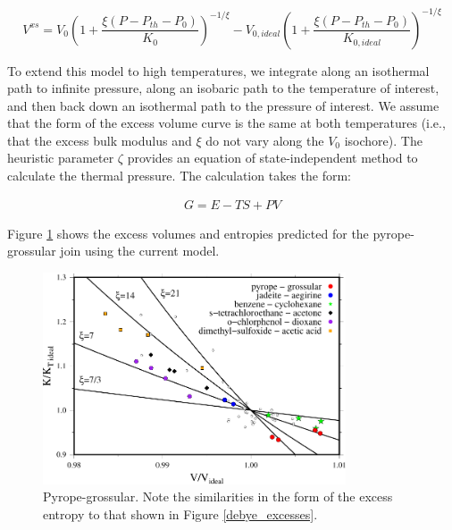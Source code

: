\begin{equation}
V^{xs} = V_0 \left(1 + \frac{\xi \left(P - P_{th} - P_0\right)}{K_0}\right)^{-1/\xi} - V_{0, ideal} \left(1 + \frac{\xi \left(P - P_{th} - P_0\right)}{K_{0, ideal}}\right)^{-1/\xi} 
\end{equation}

To extend this model to high temperatures, we integrate along an isothermal path to infinite pressure, along an isobaric path to the temperature of interest, and then back down an isothermal path to the pressure of interest. We assume that the form of the excess volume curve is the same at both temperatures (i.e., that the excess bulk modulus and $\xi$ do not vary along the $V_0$ isochore). The heuristic parameter $\zeta$ provides an equation of state-independent method to calculate the thermal pressure. The calculation takes the form:


\begin{eqnarray}
  G = E - TS + PV
\end{eqnarray}

Figure \ref{fig:xs_model} shows the excess volumes and entropies predicted for the pyrope-grossular join using the current model.
\begin{figure}[ht!]
  \centering
  \includegraphics[width=0.8\textwidth]{figures/VK_ratio}
  \caption{Pyrope-grossular. Note the similarities in the form of the excess entropy to that shown in Figure \ref{debye_excesses}.}
  \label{fig:xs_model}
\end{figure}


